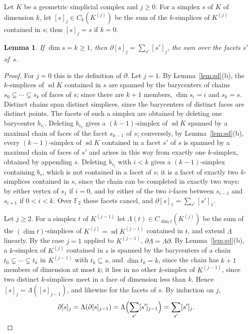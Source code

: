 \documentclass[11pt]{article}
\newtheorem{lemma}[theorem]{Lemma}
\theoremstyle{definition}
\numberwithin{equation}{section}
\newcommand{\F}{\mathbb F_2}
\begin{document}
Let $K$ be a geometric simplicial complex and $j\ge0$. For a simplex $s$ of $K$ of dimension $k$, let $[s]_j\in C_k(K^{(j)})$ be the sum of the $k$-simplices of $K^{(j)}$ contained in $s$; thus $[s]_j=s$ if $k=0$.

\begin{lemma}\label{lem:fundamental}
If $\dim s=k\ge1$, then $\partial[s]_j=\sum_{s'}[s']_j$, the sum over the facets $s'$ of~$s$.
\end{lemma}
\begin{proof}
For $j=0$ this is the definition of $\partial$. Let $j=1$. By Lemma~\ref{lem:sd}(b), the $k$-simplices of $\operatorname{sd}K$ contained in $s$ are spanned by the barycenters of chains $s_0\subsetneq\cdots\subsetneq s_k$ of faces of $s$; since there are $k+1$ members, $\dim s_i=i$ and $s_k=s$. Distinct chains span distinct simplices, since the barycenters of distinct faces are distinct points. The facets of such a simplex are obtained by deleting one barycenter $b_{s_i}$. Deleting $b_{s_k}$ gives a $(k-1)$-simplex of $\operatorname{sd}K$ spanned by a maximal chain of faces of the facet $s_{k-1}$ of $s$; conversely, by Lemma~\ref{lem:sd}(b), every $(k-1)$-simplex of $\operatorname{sd}K$ contained in a facet $s'$ of $s$ is spanned by a maximal chain of faces of $s'$ and arises in this way from exactly one $k$-simplex, obtained by appending $s$. Deleting $b_{s_i}$ with $i<k$ gives a $(k-1)$-simplex containing $b_s$, which is not contained in a facet of $s$; it is a facet of exactly two $k$-simplices contained in $s$, since the chain can be completed in exactly two ways: by either vertex of $s_1$ if $i=0$, and by either of the two $i$-faces between $s_{i-1}$ and $s_{i+1}$ if $0<i<k$. Over $\F$ these facets cancel, and $\partial[s]_1=\sum_{s'}[s']_1$.

Let $j\ge2$. For a simplex $t$ of $K^{(j-1)}$ let $\Lambda(t)\in C_{\dim t}(K^{(j)})$ be the sum of the $(\dim t)$-simplices of $K^{(j)}=\operatorname{sd}K^{(j-1)}$ contained in $t$, and extend $\Lambda$ linearly. By the case $j=1$ applied to $K^{(j-1)}$, $\partial\Lambda=\Lambda\partial$. By Lemma~\ref{lem:sd}(b), a $k$-simplex of $K^{(j)}$ contained in $s$ is spanned by the barycenters of a chain $t_0\subsetneq\cdots\subsetneq t_k$ in $K^{(j-1)}$ with $t_k\subseteq s$, and $\dim t_k=k$, since the chain has $k+1$ members of dimension at most $k$; it lies in no other $k$-simplex of $K^{(j-1)}$, since two distinct $k$-simplices meet in a face of dimension less than $k$. Hence $[s]_j=\Lambda([s]_{j-1})$, and likewise for the facets of $s$. By induction on $j$,
\begin{equation*}
 \partial[s]_j=\Lambda(\partial[s]_{j-1})=\Lambda\Bigl(\sum_{s'}[s']_{j-1}\Bigr)=\sum_{s'}[s']_j.\qedhere
\end{equation*}
\end{proof}
\end{document}

